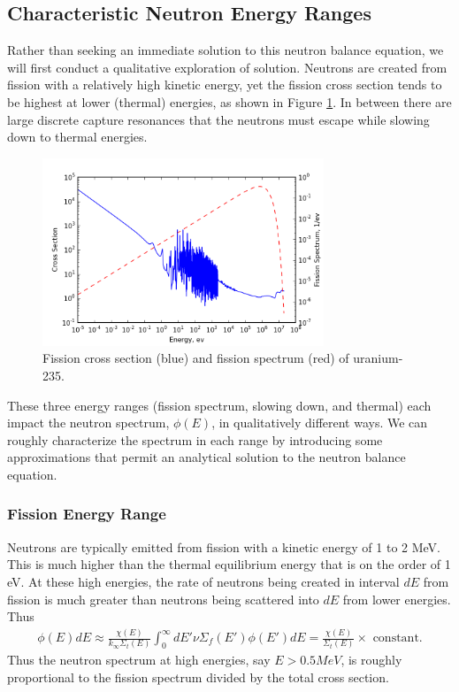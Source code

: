 \documentclass[11pt]{article}
\begin{document}
\subsection{Characteristic Neutron Energy Ranges}
\label{sec:orgheadline32}
Rather than seeking an immediate solution to this neutron balance equation, we will first conduct a qualitative exploration of solution.  Neutrons are created from fission with a relatively high kinetic energy, yet the fission cross section tends to be highest at lower (thermal) energies, as shown in Figure \ref{fig::u235fission}.  In between there are large discrete capture resonances that the neutrons must escape while slowing down to thermal energies.
\begin{figure}
  \centering
  \includegraphics[width=0.75\textwidth]{u235fission.png}
  \caption{Fission cross section (blue) and fission spectrum (red) of uranium-235.}
  \label{fig::u235fission}
\end{figure}

These three energy ranges (fission spectrum, slowing down, and thermal) each impact the neutron spectrum, \(\phi(E)\), in qualitatively different ways.  We can roughly characterize the spectrum in each range by introducing some approximations that permit an analytical solution to the neutron balance equation.
\subsubsection{Fission Energy Range}
\label{sec:orgheadline29}
Neutrons are typically emitted from fission with a kinetic energy of 1 to 2 MeV.  This is much higher than the thermal equilibrium energy that is on the order of 1 eV.  At these high energies, the rate of neutrons being created in interval \(dE\) from fission is much greater than neutrons being scattered into \(dE\) from lower energies.  Thus
\begin{align}
  \phi(E) dE \approx  \frac{\chi(E)}{k_\infty\Sigma_t(E)} \int_0^\infty dE' \nu\Sigma_f(E') \phi(E')  dE = \frac{\chi(E)}{\Sigma_t(E)} \times \text{ constant}.
\end{align}
Thus the neutron spectrum at high energies, say \(E > 0.5 MeV\), is roughly proportional to the fission spectrum divided by the total cross section.
\end{document}
